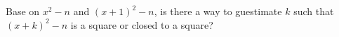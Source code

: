 \begin{ex}
  Base on $x^2 - n$ and $(x + 1)^2 - n$, is there a way to guestimate
  $k$ such that
  $(x + k)^2 - n$ is a square or closed to a square?
\end{ex}


\begin{comment}
  Square check:

  n^2 \equiv 0,1 (4)               --> 50%
  n^2 \equiv 0,1,4 (8)             --> 3/8 = 37.5%
  n^2 \equiv 0,1,4,9 (16)          --> 4/16 = 25%
  n^2 \equiv 0,1,4,9,16,17,25 (32) --> 7/32 = 21.8%

  Therefore is 1st 5 bits not 00000 or 00100 or *0001 or *1001, n is not square
  
  x^2 - n ... find first z^2     ---> z^2 <= x^2 - n
  (x+1)^2-n = x^2 - n + 2*x + 1, (z+1)^2 = z^2 + 2z + 1 ---> (z+1)^2 <= (x+1)^2 - n

  x^2 - n increase by 2x + 1
  z^2     increase by 2z + 1
  DIFF = 2(z - x)
  
  DELTA = (x^2 - n) - z^2.


  x^2 -> (x+1)^2 = x^2 + 2x + 1
  For k steps:
  (x+k)^2 = x^2 + 2kx + 1
  Find best k.
  
\end{comment}






